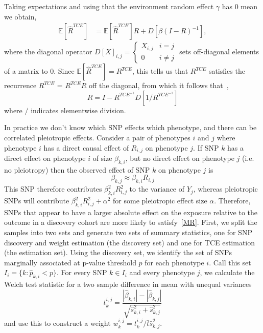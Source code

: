 \documentclass{article}
\begin{document}
Taking expectations and using that the environment random effect $\gamma$ has 0 mean we obtain,
\begin{align*}
\mathbb{E}[\hat{R}^{TCE}]  &= \mathbb{E}[\hat{R}^{TCE}] R + D[\beta (I-R)^{-1}],
\end{align*}
where the diagonal operator $D[X]_{i,j} = \left\{ \begin{array}{ll}
  X_{i,j} & i=j \\ 0 & i \neq j \end{array} \right.$ sets off-diagonal elements
  of a matrix to 0.
  Since $\mathbb{E}[\hat{R}^{TCE}] =R^{TCE}$,
this tells us that $R^{TCE}$ satisfies the recurrence
  $R^{TCE}$ = $R^{TCE} R$ off the diagonal, from
  which it follows that~\cite{Pachter},
\begin{equation}\label{r_dce}
R = I - R^{TCE^{-1}} D[1 / R^{TCE^{-1}}]
\end{equation}
where $/$ indicates elementwise division.

In practice we don't know which SNP effects which phenotype,
and there can be correlated pleiotropic effects.
Consider a pair of phenotypes $i$ and $j$ where phenotype $i$ has a direct causal
effect of $R_{i, j}$ on phenotype $j$. If SNP $k$ has a direct effect on phenotype $i$
of size $\beta_{k, i}$, but no direct effect on phenotype $j$ (i.e. no pleiotropy)
then the observed effect of SNP $k$ on phenotype $j$ is
\begin{equation}\label{MR}
\beta_{k,j} \approx \beta_{k,i} R_{i,j}
\end{equation}
This SNP therefore contributes
$\beta_{k, i}^2 R_{i, j}^2$ to the variance of $Y_j$, whereas
pleiotropic SNPs will contribute $\beta_{k, i}^2 R_{i, j}^2 + \alpha^2$
for some pleiotropic effect size $\alpha$. Therefore, SNPs that appear to
have a larger absolute effect on the exposure relative to the outcome in a discovery 
cohort are more likely to satisfy~\eqref{MR}.
First, we split the samples into two sets and generate two sets of summary statistics,
one for SNP discovery and weight estimation (the discovery set) and one for TCE estimation
(the estimation set). Using the discovery set, we identify the set of SNPs marginally
associated at p-value threshold $p$ for each phenotype $i$.
Call this set $I_i = \{k: \hat{p}_{k, i} < p\}$. For every SNP $k \in I_i$ and
every phenotype $j$, we calculate the Welch test statistic for a two sample difference in mean with
unequal variances~\cite{Welch1947}
\begin{equation}
t^{i,j}_k = \frac{|\hat{\beta}_{k, i}| - |\hat{\beta}_{k, j}|}
  {\sqrt{\hat{s}^2_{k, i} + \hat{s}^2_{k, j}}}
\end{equation}
and use this to construct a weight $w^{i, j}_k = t^{i,j}_k/\bar{t} \hat{s}_{k, j}^2$.
  
\end{document}
